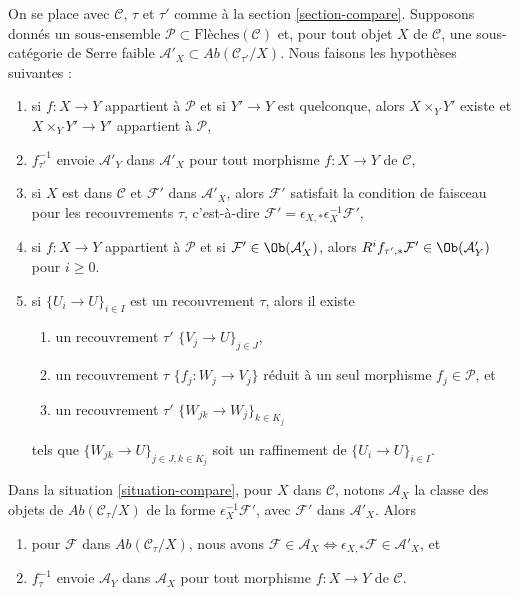 \begin{situation}
\label{situation-compare}
On se place avec $\mathcal{C}$, $\tau$ et $\tau'$ comme à la section
\ref{section-compare}. Supposons donnés un sous-ensemble
$\mathcal{P} \subset \text{Flèches}(\mathcal{C})$ et, pour tout objet $X$ de
$\mathcal{C}$, une sous-catégorie de Serre faible
$\mathcal{A}'_X \subset \textit{Ab}(\mathcal{C}_{\tau'}/X)$.
Nous faisons les hypothèses suivantes :
\begin{enumerate}
\item
\label{item-base-change-P}
si $f : X \to Y$ appartient à $\mathcal{P}$ et si $Y' \to Y$ est quelconque,
alors $X \times_Y Y'$ existe et $X \times_Y Y' \to Y'$ appartient à $\mathcal{P}$,
\item
\label{item-restriction-A}
$f_{\tau'}^{-1}$ envoie $\mathcal{A}'_Y$ dans $\mathcal{A}'_X$
pour tout morphisme $f : X \to Y$ de $\mathcal{C}$,
\item
\label{item-A-sheaf}
si $X$ est dans $\mathcal{C}$ et $\mathcal{F}'$ dans $\mathcal{A}'_X$, alors
$\mathcal{F}'$ satisfait la condition de faisceau pour les recouvrements
$\tau$, c'est-à-dire
$\mathcal{F}' = \epsilon_{X, *}\epsilon_X^{-1}\mathcal{F}'$,
\item
\label{item-A-and-P}
si $f : X \to Y$ appartient à $\mathcal{P}$ et si
$\mathcal{F}' \in \Ob(\mathcal{A}'_X)$, alors
$R^if_{\tau', *}\mathcal{F}' \in \Ob(\mathcal{A}'_Y)$
pour $i \geq 0$.
\item
\label{item-refine-tau-by-P}
si $\{U_i \to U\}_{i \in I}$ est un recouvrement $\tau$, alors il existe
\begin{enumerate}
\item un recouvrement $\tau'$ $\{V_j \to U\}_{j \in J}$,
\item un recouvrement $\tau$ $\{f_j : W_j \to V_j\}$ réduit à un seul
morphisme $f_j \in \mathcal{P}$, et
\item un recouvrement $\tau'$ $\{W_{jk} \to W_j\}_{k \in K_j}$
\end{enumerate}
tels que $\{W_{jk} \to U\}_{j \in J, k \in K_j}$ soit un raffinement de
$\{U_i \to U\}_{i \in I}$.
\end{enumerate}
\end{situation}

\begin{lemma}
\label{lemma-A}
Dans la situation \ref{situation-compare}, pour $X$ dans $\mathcal{C}$,
notons $\mathcal{A}_X$ la classe des objets de
$\textit{Ab}(\mathcal{C}_\tau/X)$ de la forme
$\epsilon_X^{-1}\mathcal{F}'$, avec $\mathcal{F}'$ dans $\mathcal{A}'_X$.
Alors
\begin{enumerate}
\item pour $\mathcal{F}$ dans $\textit{Ab}(\mathcal{C}_\tau/X)$,
nous avons $\mathcal{F} \in \mathcal{A}_X \Leftrightarrow
\epsilon_{X, *}\mathcal{F} \in \mathcal{A}'_X$, et
\item $f_\tau^{-1}$ envoie $\mathcal{A}_Y$ dans $\mathcal{A}_X$
pour tout morphisme $f : X \to Y$ de $\mathcal{C}$.
\end{enumerate}
\end{lemma}

